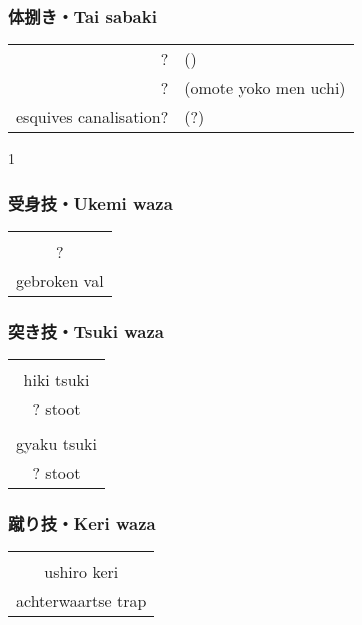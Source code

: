 \subsubsection{体捌き・Tai sabaki}
\begin{table}[H]
\begin{center}
\begin{tabular}{rl}
    ? & (\ruby{}{})\\
    ? & (omote yoko men uchi)\\
    esquives canalisation? & (?)
\end{tabular}
\end{center}
\label{kyuu_3_taisabaki}
\end{table}
\begin{center}
    1 
\end{center}

\subsubsection{受身技・Ukemi waza}
\begin{table}[H]
\begin{center}
\begin{tabular}{c}
    \ruby{}{}\\
    ?\\
    gebroken val
\end{tabular}
\end{center}
\label{kyuu_3_ukemi_waza}
\end{table}

\subsubsection{突き技・Tsuki waza}
\begin{table}[H]
\begin{center}
\begin{tabular}{c}
    \ruby{}{}\\
    hiki tsuki\\
    ? stoot\\
    \hline
    \ruby{}{}\\
    gyaku tsuki\\
    ? stoot
\end{tabular}
\end{center}
\label{kyuu_3_tsuki_waza}
\end{table}

\subsubsection{蹴り技・Keri waza}
\begin{table}[H]
\begin{center}
\begin{tabular}{c}
    \ruby{}{}\ruby{}{}\\
    ushiro keri\\
    achterwaartse trap
\end{tabular}
\end{center}
\label{kyuu_3_keri_waza}
\end{table}

